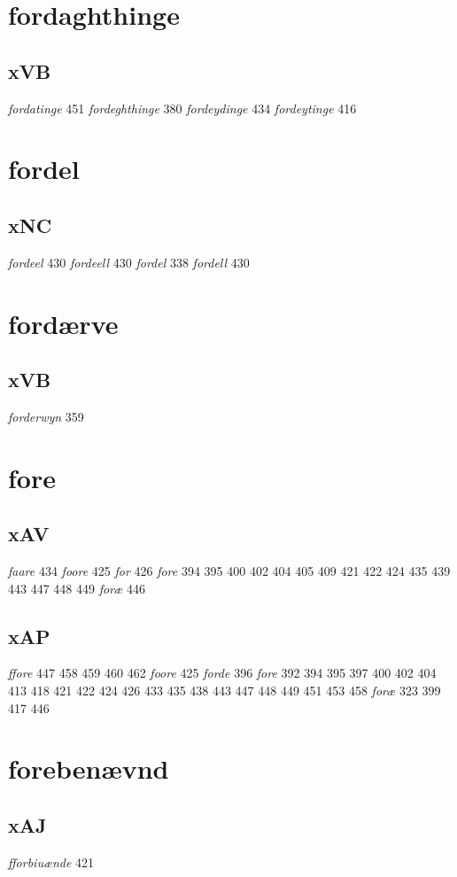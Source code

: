 \documentclass[a4paper,twocolumn]{article}
\begin{document}
\section{fordaghthinge}
\label{sec:org46c63c0}
\subsection{xVB}
\label{sec:orgd1cceed}
\emph{fordatinge} 451 \emph{fordeghthinge} 380 \emph{fordeydinge} 434 \emph{fordeytinge} 416 
\section{fordel}
\label{sec:org9313024}
\subsection{xNC}
\label{sec:orgde82574}
\emph{fordeel} 430 \emph{fordeell} 430 \emph{fordel} 338 \emph{fordell} 430 
\section{fordærve}
\label{sec:org01520a0}
\subsection{xVB}
\label{sec:orgbc3dc8a}
\emph{forderwyn} 359 
\section{fore}
\label{sec:org04571e7}
\subsection{xAV}
\label{sec:org741471e}
\emph{faare} 434 \emph{foore} 425 \emph{for} 426 \emph{fore} 394 395 400 402 404 405 409 421 422 424 435 439 443 447 448 449 \emph{foræ} 446 
\subsection{xAP}
\label{sec:orgb7c8ff0}
\emph{ffore} 447 458 459 460 462 \emph{foore} 425 \emph{forde} 396 \emph{fore} 392 394 395 397 400 402 404 413 418 421 422 424 426 433 435 438 443 447 448 449 451 453 458 \emph{foræ} 323 399 417 446 
\section{forebenævnd}
\label{sec:orgf48b9c1}
\subsection{xAJ}
\label{sec:org70fbe9e}
\emph{fforbiuænde} 421 
\end{document}
